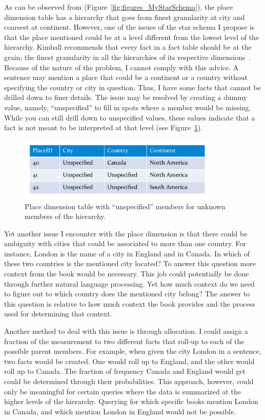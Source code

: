 As can be observed from (Figure~\ref{fig:figures_MyStarSchema}), the place dimension table has a hierarchy that goes from finest granularity at city and
coarsest at continent. However, one of the issues of the star schema I propose is that the place mentioned could be at a level different from the lowest level
of the hierarchy. Kimball recommends that every fact in a fact table should be at the grain; the finest granularity in all the hierarchies of its respective
dimensions~\cite{kimball2002dwt}. Because of the nature of the problem, I cannot comply with this advice. A sentence may mention a place that could be a
continent or a country without specifying the country or city in question. Thus, I have some facts that cannot be drilled down to finer details. The issue
may be resolved by creating a dummy value, namely, ``unspecified'' to fill in spots where a member would be missing. While you can still drill down to
unspecified values, these values indicate that a fact is not meant to be interpreted at that level (see Figure~\ref{fig:figures_UnspecifiedValue}).

\begin{figure}[htbp]
    \centering
        \includegraphics[height=1.2in]{figures/UnspecifiedValue.pdf}
    \caption{Place dimension table with ``unspecified'' members for unknown members of the hierarchy.}
    \label{fig:figures_UnspecifiedValue}
\end{figure}

Yet another issue I encounter with the place dimension is that there could be ambiguity with cities that could be associated to more than one country. For
instance, London is the name of a city in England and in Canada. In which of these two countries is the mentioned city located? To answer this question more
context from the book would be necessary. This job could potentially be done through further natural language processing. Yet how much context do we need to
figure out to which country does the mentioned city belong? The answer to this question is relative to how much context the book provides and the process used
for determining that context.

Another method to deal with this issue is through allocation. I could assign a fraction of the measurement to two different facts that roll-up to each of the
possible parent members. For example, when given the city London in a sentence, two facts would be created. One would roll up to England, and the other would
roll up to Canada. The fraction of frequency Canada and England would get could be determined through their probabilities. This approach, however, could only
be meaningful for certain queries where the data is summarized at the higher levels of the hierarchy. Querying for which specific books mention London in
Canada, and which mention London in England would not be possible.

